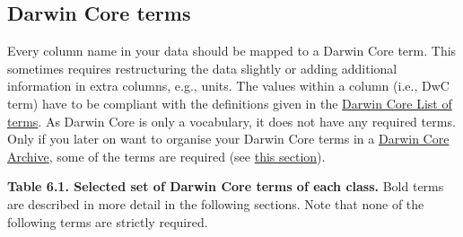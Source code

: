 \documentclass[
]{book}
\begin{document}
\hypertarget{darwin-core-terms}{%
\subsection{Darwin Core terms}\label{darwin-core-terms}}

Every column name in your data should be mapped to a Darwin Core term. This sometimes requires restructuring the data slightly or adding additional information in extra columns, e.g., units. The values within a column (i.e., DwC term) have to be compliant with the definitions given in the \href{https://dwc.tdwg.org/list/}{Darwin Core List of terms}. As Darwin Core is only a vocabulary, it does not have any required terms. Only if you later on want to organise your Darwin Core terms in a \protect\hyperlink{DwC-A}{Darwin Core Archive}, some of the terms are required (see \protect\hyperlink{DarwinCore-Archive}{this section}).

{\textbf{Table 6.1. Selected set of Darwin Core terms of each class.} Bold terms are described in more detail in the following sections. Note that none of the following terms are strictly required.}
\end{document}
